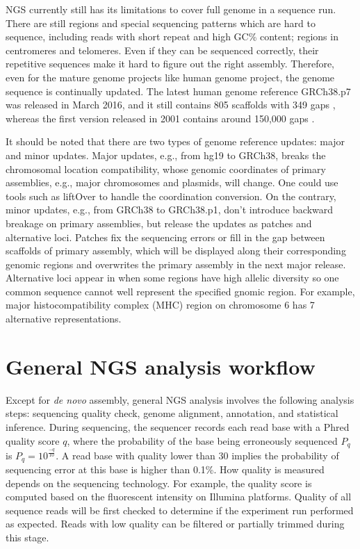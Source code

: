 
NGS currently still has its limitations to cover full genome in a sequence run.
There are still regions and special sequencing patterns which are hard to
sequence, including reads with short repeat and high GC\% content; regions in
centromeres and telomeres. Even if they can be sequenced correctly, their
repetitive sequences make it hard to figure out the right assembly. Therefore,
even for the mature genome projects like human genome project, the genome
sequence is continually updated. The latest human genome reference GRCh38.p7
was released in March 2016, and it still contains 805 scaffolds with 349 gaps
\cite{:grch38p7}, whereas the first version released in 2001 contains around
150,000 gaps \cite{2010:e-pluribus-unum}.


It should be noted that there are two types of genome reference updates: major
and minor updates. Major updates, e.g., from hg19 to GRCh38, breaks the
chromosomal location compatibility, whose genomic coordinates of primary
assemblies, e.g., major chromosomes and plasmids, will change. One could use
tools such as liftOver to handle the coordination conversion. On the contrary,
minor updates, e.g., from GRCh38 to GRCh38.p1, don't introduce backward
breakage on primary assemblies, but release the updates as patches and
alternative loci. Patches fix the sequencing errors or fill in the gap between
scaffolds of primary assembly, which will be displayed along their
corresponding genomic regions and overwrites the primary assembly in the next
major release. Alternative loci appear in when some regions have high allelic
diversity so one common sequence cannot well represent the specified gnomic
region. For example, major histocompatibility complex (MHC) region on
chromosome 6 has 7 alternative representations.


%
%

\section{General NGS analysis workflow}

Except for \textit{de novo} assembly, general NGS analysis involves the
following analysis steps: sequencing quality check, genome alignment,
annotation, and statistical inference. During sequencing, the sequencer records
each read base with a Phred quality score $q$, where the probability of the
base being erroneously sequenced $P_q$ is $P_q = 10^{\frac{-q}{10}}$. A read
base with quality lower than 30 implies the probability of sequencing error at
this base is higher than 0.1\%. How quality is measured depends on the
sequencing technology. For example, the quality score is computed based on the
fluorescent intensity on Illumina platforms. Quality of all sequence reads will
be first checked to determine if the experiment run performed as expected.
Reads with low quality can be filtered or partially trimmed during this stage.

